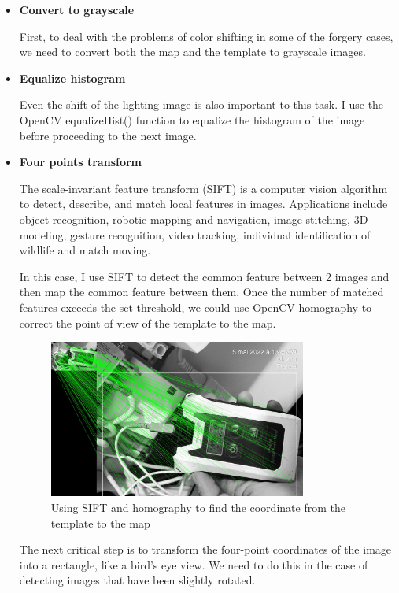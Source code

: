 \begin{itemize}
    \item \textbf{Convert to grayscale}
    
First, to deal with the problems of color shifting in some of the forgery cases, we need to convert both the map and the template to grayscale images.

    \item \textbf{Equalize histogram}

Even the shift of the lighting image is also important to this task. I use the OpenCV\cite{opencv_library} equalizeHist() function to equalize the histogram of the image before proceeding to the next image.

    \item \textbf{Four points transform}

The scale-invariant feature transform (SIFT)\cite{lowe1999object} is a computer vision algorithm to detect, describe, and match local features in images. Applications include object recognition, robotic mapping and navigation, image stitching, 3D modeling, gesture recognition, video tracking, individual identification of wildlife and match moving.

In this case, I use SIFT to detect the common feature between 2 images and then map the common feature between them. Once the number of matched features exceeds the set threshold, we could use OpenCV homography to correct the point of view of the template to the map.

\begin{figure}[H]
    \centering
    \includegraphics[width=0.8\textwidth]{images/example_front.jpg}
    \caption{Using SIFT and homography to find the coordinate from the template to the map}
    \label{fig:sift}
\end{figure}

The next critical step is to transform the four-point coordinates of the image into a rectangle, like a bird's eye view. We need to do this in the case of detecting images that have been slightly rotated.
    

\end{itemize}
